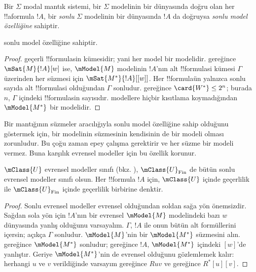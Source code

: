 \documentclass[../../../include/open-logic-section]{subfiles}
\begin{document}


\begin{defn}
  Bir $\Sigma$ modal mantık sistemi, bir $\Sigma$ modelinin bir dünyasında
  doğru olan her !!a{formula} $!A$, bir \emph{sonlu} $\Sigma$ modelinin bir
  dünyasında $!A$ da doğruysa \emph{sonlu model özelliğine} sahiptir.
\end{defn}

\begin{prop}
   sonlu model özelliğine sahiptir.
\end{prop}

\begin{proof}
   geçerli !!{formula}s{}in kümesidir; yani her model bir
   modelidir.  gereğince
  $\mSat{M}{!A}[w]$ ise, $\mModel{M}$ modelinin $!A$'nın alt
  !!{formula}s{}i kümesi $\Gamma$ üzerinden her süzmesi için
  $\mSat{M^*}{!A}[{[w]}]$. Her !!{formula}{}ün yalnızca sonlu sayıda alt
  !!{formula}s{}i olduğundan $\Gamma$ sonludur.
   gereğince
  $\card{W^*}\leq2^n$; burada $n$, $\Gamma$ içindeki !!{formula}s{}in
  sayısıdır.  modellere hiçbir kısıtlama koymadığından
  $\mModel{M^*}$ bir  modelidir.
\end{proof}

Bir  mantığının süzmeler aracılığıyla sonlu model özelliğine sahip
olduğunu göstermek için, bir  modelinin süzmesinin kendisinin de
bir  modeli olması zorunludur. Bu çoğu zaman epey çalışma
gerektirir ve her süzme bir  modeli vermez. Buna karşılık evrensel
modeller için bu özellik korunur.

\begin{prop}
  $\mClass{U}$ evrensel modeller sınıfı
  (bkz. ),
  $\mClass{U}_\mathrm{Fin}$ de bütün sonlu evrensel modeller sınıfı olsun.
  Her !!{formula} $!A$ için, $\mClass{U}$ içinde geçerlilik ile
  $\mClass{U}_\mathrm{Fin}$ içinde geçerlilik birbirine denktir.
\end{prop}

\begin{proof}
  Sonlu evrensel modeller evrensel olduğundan soldan sağa yön önemsizdir.
  Sağdan sola yön için $!A$'nın bir evrensel $\mModel{M}$ modelindeki bazı
  $w$ dünyasında yanlış olduğunu varsayalım. $\Gamma$, $!A$ ile onun bütün
  alt formüllerini içersin; açıkça $\Gamma$ sonludur. $\mModel{M}$'nin bir
  $\mModel{M^*}$ süzmesini alın. 
  gereğince $\mModel{M^*}$ sonludur; 
  gereğince $!A$, $\mModel{M^*}$ içindeki $[w]$'de yanlıştır. Geriye
  $\mModel{M^*}$'nin de evrensel olduğunu gözlemlemek kalır: herhangi $u$ ve $v$
  verildiğinde varsayım gereğince $Ruv$ ve
   gereğince
  $R^*[u][v]$.
\end{proof}
\end{document}
